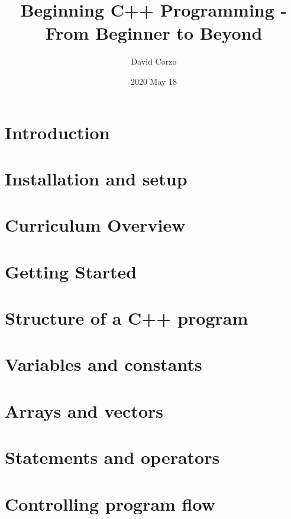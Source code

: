 \documentclass[openany]{book}
\title{Beginning C++ Programming - From Beginner to Beyond}
\date{2020 May 18} %
\author{David Corzo}
\begin{document}
\maketitle
\tableofcontents

\chapter{Introduction}


\chapter{Installation and setup}


\chapter{Curriculum Overview}


\chapter{Getting Started}


\chapter{Structure of a C++ program}


\chapter{Variables and constants}


\chapter{Arrays and vectors}


\chapter{Statements and operators}


\chapter{Controlling program flow}

\end{document}
